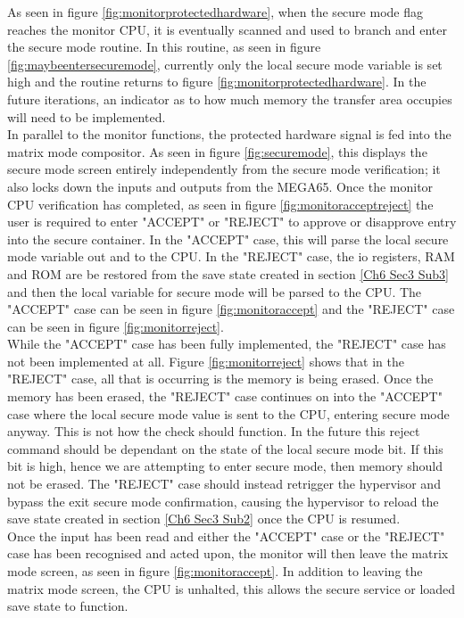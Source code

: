 As seen in figure \ref{fig:monitorprotectedhardware}, when the secure mode flag reaches the monitor CPU, it is eventually scanned and used to branch and enter the secure mode routine. In this routine, as seen in figure \ref{fig:maybeentersecuremode}, currently only the local secure mode variable is set high and the routine returns to figure \ref{fig:monitorprotectedhardware}. In the future iterations, an indicator as to how much memory the transfer area occupies will need to be implemented.\\

In parallel to the monitor functions, the protected hardware signal is fed into the matrix mode compositor. As seen in figure \ref{fig:securemode}, this displays the secure mode screen entirely independently from the secure mode verification; it also locks down the inputs and outputs from the MEGA65. Once the monitor CPU verification has completed, as seen in figure \ref{fig:monitoracceptreject} the user is required to enter "ACCEPT" or "REJECT" to approve or disapprove entry into the secure container. In the "ACCEPT" case, this will parse the local secure mode variable out and to the CPU. In the "REJECT" case, the io registers, RAM and ROM are be restored from the save state created in section \ref{Ch6 Sec3 Sub3} and then the local variable for secure mode will be parsed to the CPU. The "ACCEPT" case can be seen in figure \ref{fig:monitoraccept} and the "REJECT" case can be seen in figure \ref{fig:monitorreject}.\\

While the "ACCEPT" case has been fully implemented, the "REJECT" case has not been implemented at all. Figure \ref{fig:monitorreject} shows that in the "REJECT" case, all that is occurring is the memory is being erased. Once the memory has been erased, the "REJECT" case continues on into the "ACCEPT" case where the local secure mode value is sent to the CPU, entering secure mode anyway. This is not how the check should function. In the future this reject command should be dependant on the state of the local secure mode bit. If this bit is high, hence we are attempting to enter secure mode, then memory should not be erased. The "REJECT" case should instead retrigger the hypervisor and bypass the exit secure mode confirmation, causing the hypervisor to reload the save state created in section \ref{Ch6 Sec3 Sub2} once the CPU is resumed.\\

Once the input has been read and either the "ACCEPT" case or the "REJECT" case has been recognised and acted upon, the monitor will then leave the matrix mode screen, as seen in figure \ref{fig:monitoraccept}. In addition to leaving the matrix mode screen, the CPU is unhalted, this allows the secure service or loaded save state to function.

